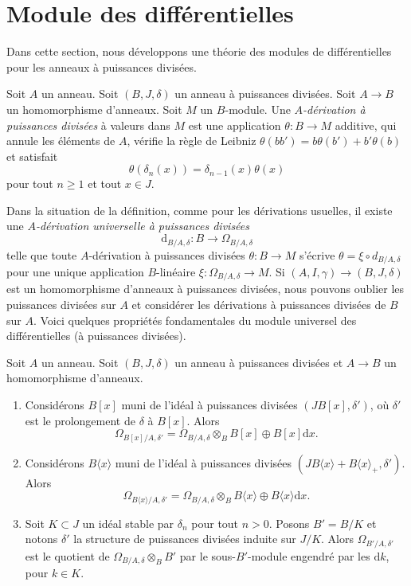 \section{Module des différentielles}
\label{section-differentials}

\noindent
Dans cette section, nous développons une théorie des modules de différentielles
pour les anneaux à puissances divisées.

\begin{definition}
\label{definition-derivation}
Soit $A$ un anneau. Soit $(B, J, \delta)$ un anneau à puissances divisées.
Soit $A \to B$ un homomorphisme d'anneaux. Soit $M$ un $B$-module.
Une {\it $A$-dérivation à puissances divisées} à valeurs dans $M$ est une application
$\theta : B \to M$ additive, qui annule les éléments
de $A$, vérifie la règle de Leibniz
$\theta(bb') = b\theta(b') + b'\theta(b)$ et satisfait
$$
\theta(\delta_n(x)) = \delta_{n - 1}(x)\theta(x)
$$
pour tout $n \geq 1$ et tout $x \in J$.
\end{definition}

\noindent
Dans la situation de la définition, comme pour les dérivations
usuelles, il existe une {\it $A$-dérivation universelle à puissances divisées}
$$
\text{d}_{B/A, \delta} : B \to \Omega_{B/A, \delta}
$$
telle que toute $A$-dérivation à puissances divisées $\theta : B \to M$ s'écrive
$\theta = \xi \circ d_{B/A, \delta}$ pour une unique application $B$-linéaire
$\xi : \Omega_{B/A, \delta} \to M$. Si $(A, I, \gamma) \to (B, J, \delta)$
est un homomorphisme d'anneaux à puissances divisées, nous pouvons oublier les
puissances divisées sur $A$ et considérer les dérivations à puissances divisées de
$B$ sur $A$. Voici quelques propriétés fondamentales du module universel
des différentielles (à puissances divisées).

\begin{lemma}
\label{lemma-omega}
Soit $A$ un anneau. Soit $(B, J, \delta)$ un anneau à puissances divisées et
$A \to B$ un homomorphisme d'anneaux. 
\begin{enumerate}
\item Considérons $B[x]$ muni de l'idéal à puissances divisées $(JB[x], \delta')$,
où $\delta'$ est le prolongement de $\delta$ à $B[x]$. Alors
$$
\Omega_{B[x]/A, \delta'} =
\Omega_{B/A, \delta} \otimes_B B[x] \oplus B[x]\text{d}x.
$$
\item Considérons $B\langle x \rangle$ muni de l'idéal à puissances divisées
$(JB\langle x \rangle + B\langle x \rangle_{+}, \delta')$. Alors
$$
\Omega_{B\langle x\rangle/A, \delta'} =
\Omega_{B/A, \delta} \otimes_B B\langle x \rangle \oplus
B\langle x\rangle \text{d}x.
$$
\item Soit $K \subset J$ un idéal stable par $\delta_n$ pour
tout $n > 0$. Posons $B' = B/K$ et notons $\delta'$ la structure de
puissances divisées induite sur $J/K$. Alors $\Omega_{B'/A, \delta'}$ est le quotient
de $\Omega_{B/A, \delta} \otimes_B B'$ par le sous-$B'$-module engendré
par les $\text{d}k$, pour $k \in K$.
\end{enumerate}
\end{lemma}

